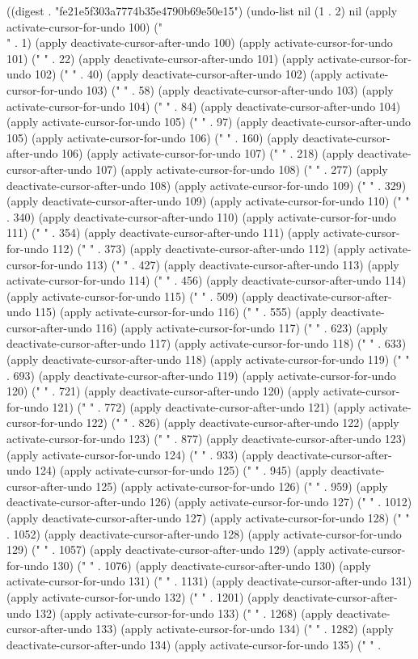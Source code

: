 
((digest . "fe21e5f303a7774b35e4790b69e50e15") (undo-list nil (1 . 2) nil (apply activate-cursor-for-undo 100) ("\\" . 1) (apply deactivate-cursor-after-undo 100) (apply activate-cursor-for-undo 101) (" " . 22) (apply deactivate-cursor-after-undo 101) (apply activate-cursor-for-undo 102) (" " . 40) (apply deactivate-cursor-after-undo 102) (apply activate-cursor-for-undo 103) (" " . 58) (apply deactivate-cursor-after-undo 103) (apply activate-cursor-for-undo 104) (" " . 84) (apply deactivate-cursor-after-undo 104) (apply activate-cursor-for-undo 105) (" " . 97) (apply deactivate-cursor-after-undo 105) (apply activate-cursor-for-undo 106) (" " . 160) (apply deactivate-cursor-after-undo 106) (apply activate-cursor-for-undo 107) (" " . 218) (apply deactivate-cursor-after-undo 107) (apply activate-cursor-for-undo 108) (" " . 277) (apply deactivate-cursor-after-undo 108) (apply activate-cursor-for-undo 109) (" " . 329) (apply deactivate-cursor-after-undo 109) (apply activate-cursor-for-undo 110) (" " . 340) (apply deactivate-cursor-after-undo 110) (apply activate-cursor-for-undo 111) (" " . 354) (apply deactivate-cursor-after-undo 111) (apply activate-cursor-for-undo 112) (" " . 373) (apply deactivate-cursor-after-undo 112) (apply activate-cursor-for-undo 113) (" " . 427) (apply deactivate-cursor-after-undo 113) (apply activate-cursor-for-undo 114) (" " . 456) (apply deactivate-cursor-after-undo 114) (apply activate-cursor-for-undo 115) (" " . 509) (apply deactivate-cursor-after-undo 115) (apply activate-cursor-for-undo 116) (" " . 555) (apply deactivate-cursor-after-undo 116) (apply activate-cursor-for-undo 117) (" " . 623) (apply deactivate-cursor-after-undo 117) (apply activate-cursor-for-undo 118) (" " . 633) (apply deactivate-cursor-after-undo 118) (apply activate-cursor-for-undo 119) (" " . 693) (apply deactivate-cursor-after-undo 119) (apply activate-cursor-for-undo 120) (" " . 721) (apply deactivate-cursor-after-undo 120) (apply activate-cursor-for-undo 121) (" " . 772) (apply deactivate-cursor-after-undo 121) (apply activate-cursor-for-undo 122) (" " . 826) (apply deactivate-cursor-after-undo 122) (apply activate-cursor-for-undo 123) (" " . 877) (apply deactivate-cursor-after-undo 123) (apply activate-cursor-for-undo 124) (" " . 933) (apply deactivate-cursor-after-undo 124) (apply activate-cursor-for-undo 125) (" " . 945) (apply deactivate-cursor-after-undo 125) (apply activate-cursor-for-undo 126) (" " . 959) (apply deactivate-cursor-after-undo 126) (apply activate-cursor-for-undo 127) (" " . 1012) (apply deactivate-cursor-after-undo 127) (apply activate-cursor-for-undo 128) (" " . 1052) (apply deactivate-cursor-after-undo 128) (apply activate-cursor-for-undo 129) (" " . 1057) (apply deactivate-cursor-after-undo 129) (apply activate-cursor-for-undo 130) (" " . 1076) (apply deactivate-cursor-after-undo 130) (apply activate-cursor-for-undo 131) (" " . 1131) (apply deactivate-cursor-after-undo 131) (apply activate-cursor-for-undo 132) (" " . 1201) (apply deactivate-cursor-after-undo 132) (apply activate-cursor-for-undo 133) (" " . 1268) (apply deactivate-cursor-after-undo 133) (apply activate-cursor-for-undo 134) (" " . 1282) (apply deactivate-cursor-after-undo 134) (apply activate-cursor-for-undo 135) (" " . 